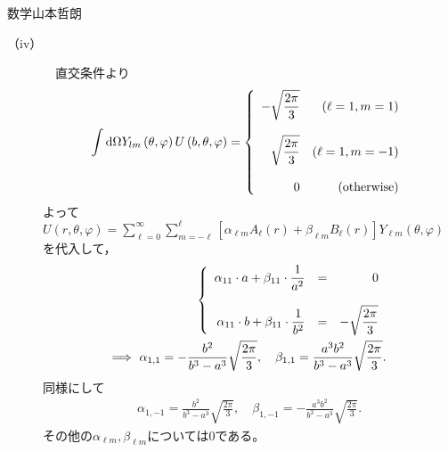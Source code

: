\documentclass[fleqn]{jbook}
\begin{document}
\begin{answer}{数学}{山本哲朗}
\begin{description}
        \item[{\rm （iv）}] 　直交条件より
\begin{equation}
\int {\d\Omega Y_{lm}\left( \theta,\varphi \right)U\left( b,\theta,\varphi \right)}=
\left\{ {\begin{array}{*{20}r}
   {\ds -\sqrt{\frac{2\pi}{3}}} & {\left( \ell=1,m=1 \right)}  \\
   \cr
   {\ds \sqrt{\frac{2\pi}{3}}} & {\left( \ell=1,m=-1 \right)}  \\
   \cr
   {\ds 0} & {\left( {\rm otherwise} \right)}  \\
\end{array}} \right.\nonumber
\end{equation}
よって$U\left( {r,\theta ,\varphi } \right) = \sum\limits_{\ell = 0}^\infty  {\sum\limits_{m =  - \ell }^{\ell } {\left[ {\alpha _{\ell m} A_\ell \left( r \right) + \beta _{\ell m} B_\ell \left( r \right)} \right]Y_{\ell m} \left( {\theta ,\varphi } \right)} } $を代入して，
\begin{eqnarray}
\left\{
\begin{array}{rrr}
\displaystyle \alpha_{11}\cdot a+\beta_{11}\cdot \frac{1}{a^2} &=& \displaystyle 0 \\
\cr
\displaystyle \alpha_{11}\cdot b+\beta_{11}\cdot \frac{1}{b^2} &=& \displaystyle -\sqrt{\frac{2\pi}{3}} \\
\end{array}
\right.\nonumber\\
\Longrightarrow~\alpha_{1,1}=-\frac{b^2}{b^3-a^3}\sqrt{\frac{2\pi}{3}},\quad 
\beta_{1,1}=\frac{a^3b^2}{b^3-a^3}\sqrt{\frac{2\pi}{3}}. \nonumber
\end{eqnarray}
同様にして
\begin{eqnarray}
\alpha_{1,-1}=\frac{b^2}{b^3-a^3}\sqrt{\frac{2\pi}{3}},\quad 
\beta_{1,-1}=-\frac{a^3b^2}{b^3-a^3}\sqrt{\frac{2\pi}{3}}. \nonumber
\end{eqnarray}
その他の$\alpha_{\ell m},\beta_{\ell m}$については$0$である。
        
    \end{description}
    

\end{answer}
\end{document}

